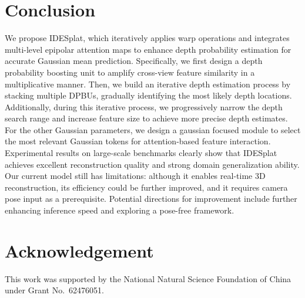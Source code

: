 \section{Conclusion}
\label{sec:conclusion}
%
We propose IDESplat, which iteratively applies warp operations and integrates multi-level epipolar attention maps to enhance depth probability estimation for accurate Gaussian mean prediction.
%
Specifically, we first design a depth probability boosting unit to amplify cross-view feature similarity in a multiplicative manner.
%
Then, we build an iterative depth estimation process by stacking multiple DPBUs, gradually identifying the most likely depth locations.
%
Additionally, during this iterative process, we progressively narrow the depth search range and increase feature size to achieve more precise depth estimates.
%
For the other Gaussian parameters, we design a gaussian focused module to select the most relevant Gaussian tokens for attention-based feature interaction.
%
Experimental results on large-scale benchmarks clearly show that IDESplat achieves excellent reconstruction quality and strong domain generalization ability.
%
%
Our current model still has limitations: although it enables real-time 3D reconstruction, its efficiency could be further improved, and it requires camera pose input as a prerequisite.
%
Potential directions for improvement include further enhancing inference speed and exploring a pose-free framework.



\section*{Acknowledgement}
{\raggedright
This work was supported by the National Natural Science Foundation of China under Grant No.~62476051.\par
}
